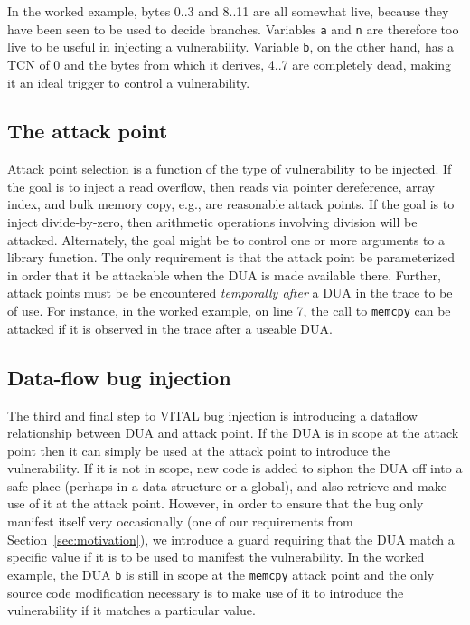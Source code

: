 In the worked example, bytes 0..3 and 8..11 are all somewhat live, because they have been seen to be used to decide branches.
Variables \verb+a+ and \verb+n+ are therefore too live to be useful in injecting a vulnerability.
Variable \verb+b+, on the other hand, has a TCN of 0 and the bytes from which it derives, 4..7 are completely dead, 
making it an ideal trigger to control a vulnerability. 

\subsection {The attack point}

Attack point selection is a function of the type of vulnerability to be injected.
If the goal is to inject a read overflow, then reads via pointer dereference, array index, and bulk memory copy, e.g., are reasonable attack points.  
If the goal is to inject divide-by-zero, then arithmetic operations involving division will be attacked. 
Alternately, the goal might be to control one or more arguments to a library function.
The only requirement is that the attack point be parameterized in order that it be attackable when the DUA is made available there. 
Further, attack points must be be encountered \emph{temporally after} a DUA in the trace to be of use. 
For instance, in the worked example, on line 7, the call to \verb+memcpy+ can be attacked if it is observed in the trace after a useable DUA.


\subsection {Data-flow bug injection}

The third and final step to VITAL bug injection is introducing a dataflow relationship between DUA and attack point.  
If the DUA is in scope at the attack point then it can simply be used at the attack point to introduce the vulnerability.
If it is not in scope, new code is added to siphon the DUA off into a safe place (perhaps in a data structure or a global), and also retrieve and make use of it at the attack point. 
However, in order to ensure that the bug only manifest itself very occasionally (one of our requirements from Section~\ref{sec:motivation}), we introduce a guard requiring that the DUA match a specific value if it is to be used to manifest the vulnerability.
In the worked example, the DUA \verb+b+ is still in scope at the \verb+memcpy+ attack point and the only source code modification necessary is to make use of it to introduce the vulnerability if it matches a particular value.  









